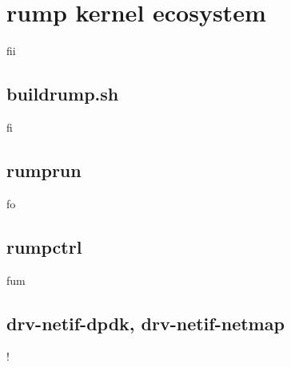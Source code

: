 \section{rump kernel ecosystem}
\label{chap:ecosystem}

fii

\subsection{buildrump.sh}

fi

\subsection{rumprun}

fo

\subsection{rumpctrl}

fum

\subsection{drv-netif-dpdk, drv-netif-netmap}

!
